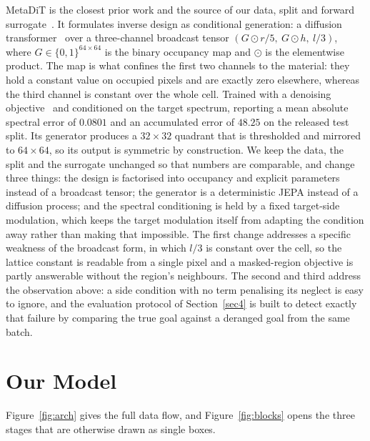 \documentclass[pdflatex,oneside,sn-mathphys-num]{sn-jnl}
\theoremstyle{thmstyleone}
\theoremstyle{thmstyletwo}
\theoremstyle{thmstylethree}
\begin{document}
MetaDiT is the closest prior work and the source of our data, split and forward
surrogate~\cite{metadit}. It formulates inverse design as conditional generation: a
diffusion transformer~\cite{dit} over a three-channel broadcast tensor
$(G\odot r/5,\ G\odot h,\ l/3)$, where $G\in\{0,1\}^{64\times64}$ is the binary occupancy map and $\odot$ is the
elementwise product. The map is what confines the first two channels to the material:
they hold a constant value on occupied pixels and are exactly zero elsewhere, whereas
the third channel is constant over the whole cell.
Trained with a denoising
objective~\cite{ddpm} and conditioned on the target spectrum, reporting a mean absolute
spectral error of $0.0801$ and an accumulated error of $48.25$ on the released test
split. Its generator produces a $32\times32$ quadrant that is thresholded and mirrored
to $64\times64$, so its output is symmetric by construction. We keep the data, the split
and the surrogate unchanged so that numbers are comparable, and change three things: the
design is factorised into occupancy and explicit parameters instead of a broadcast
tensor; the generator is a deterministic JEPA instead of a diffusion process; and the
spectral conditioning is held by a fixed target-side modulation, which keeps the target
modulation itself from adapting the condition away rather than making that impossible. The
first change addresses a
specific weakness of the broadcast form, in which $l/3$ is constant over the cell, so
the lattice constant is readable from a single pixel and a masked-region objective is
partly answerable without the region's neighbours. The second and third address the
observation above: a side condition with no term penalising its neglect is easy to
ignore, and the evaluation protocol of Section~\ref{sec4} is built to detect exactly
that failure by comparing the true goal against a deranged goal from the same batch.

\section{Our Model}\label{sec3}

Figure~\ref{fig:arch} gives the full data flow, and Figure~\ref{fig:blocks} opens the
three stages that are otherwise drawn as single boxes.
\end{document}
